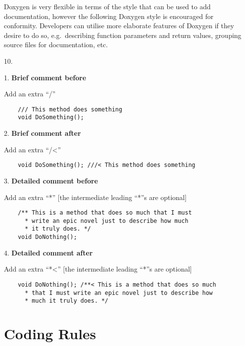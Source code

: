 Doxygen is very flexible in terms of the style that can be used to add documentation, however the following Doxygen style is encouraged for conformity. Developers can utilise more elaborate features of Doxygen if they desire to do so, e.g.\ describing function parameters and return values, grouping source files for documentation, etc.

\begin{labeling}{10.}
\item [1.] \textbf{Brief comment before}

Add an extra ``/''

\begin{verbatim}
    /// This method does something
    void DoSomething();
\end{verbatim}


\item [2.] \textbf{Brief comment after}

Add an extra ``/<''

\begin{verbatim}
    void DoSomething(); ///< This method does something
\end{verbatim}


\item [3.] \textbf{Detailed comment before}

Add an extra ``*'' [the intermediate leading ``*''s are optional]

\begin{verbatim}
    /** This is a method that does so much that I must
      * write an epic novel just to describe how much
      * it truly does. */
    void DoNothing();
\end{verbatim}


\item [4.] \textbf{Detailed comment after}

Add an extra ``*<'' [the intermediate leading ``*''s are optional]

\begin{verbatim}
    void DoNothing(); /**< This is a method that does so much
      * that I must write an epic novel just to describe how
      * much it truly does. */
\end{verbatim}

\end{labeling}


\newpage
\section{Coding Rules}

